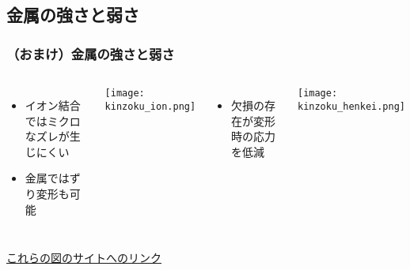 \documentclass[12pt, dvipdfmx]{beamer}
\newcommand{\backupbegin}{
   \newcounter{framenumberappendix}
   \setcounter{framenumberappendix}{\value{framenumber}}
}
\newcommand{\backupend}{
   \addtocounter{framenumberappendix}{-\value{framenumber}}
   \addtocounter{framenumber}{\value{framenumberappendix}} 
}
\begin{document}
\subsection{金属の強さと弱さ}
\begin{frame}
	\frametitle{（おまけ）金属の強さと弱さ}
		\begin{columns}[T, onlytextwidth]
				\begin{itemize}
					\item イオン結合ではミクロなズレが生じにくい
					\item 金属ではずり変形も可能
				\end{itemize}
				\begin{center}
					\texttt{[image: kinzoku\_ion.png]}
				\end{center}
				
				\begin{itemize}
					\item 欠損の存在が変形時の応力を低減
				\end{itemize}
				\begin{center}
					\texttt{[image: kinzoku\_henkei.png]}
				\end{center}
		\end{columns}
	\href{https://www.hik.shiga-irc.go.jp/info/instructions/metal/metal2/}{これらの図のサイトへのリンク}
\end{frame}




\end{document}
